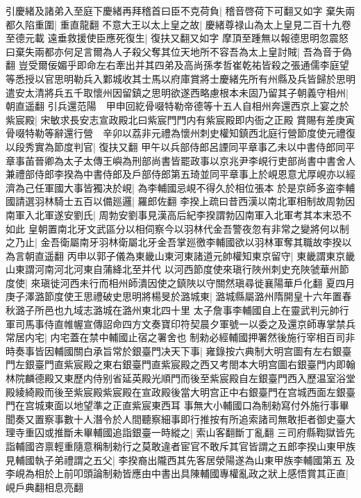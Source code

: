 引慶緒及諸弟入至庭下慶緒再拜稽首曰臣不克荷負|{
	稽音啓荷下可翻又如字}
棄失兩都久陷重圍|{
	重直龍翻}
不意大王以太上皇之故|{
	慶緒尊禄山為太上皇見二百十九卷至德元載}
遠垂救援使臣應死復生|{
	復扶又翻又如字}
摩頂至踵無以報德思明忽震怒曰棄失兩都亦何足言爾為人子殺父奪其位天地所不容吾為太上皇討賊|{
	吾為音于偽翻}
豈受爾佞媚乎即命左右牽出并其四弟及高尚孫孝哲崔乾祐皆殺之張通儒李庭望等悉授以官思明勒兵入鄴城收其士馬以府庫賞將士慶緒先所有州縣及兵皆歸於思明遣安太清將兵五千取懷州因留鎮之思明欲遂西略慮根本未固乃留其子朝義守相州|{
	朝直遥翻}
引兵還范陽　甲申回紇骨啜特勒帝德等十五人自相州奔還西京上宴之於紫宸殿|{
	宋敏求長安志宣政殿北曰紫宸門門内有紫宸殿即内衙之正殿}
賞賜有差庚寅骨啜特勒等辭還行營　辛卯以荔非元禮為懷州刺史權知鎮西北庭行營節度使元禮復以段秀實為節度判官|{
	復扶又翻}
甲午以兵部侍郎呂諲同平章事乙未以中書侍郎同平章事苖晉卿為太子太傳王嶼為刑部尚書皆罷政事以京兆尹李峴行吏部尚書中書舍人兼禮部侍郎李揆為中書侍郎及戶部侍郎第五琦並同平章事上於峴恩意尤厚峴亦以經濟為己任軍國大事皆獨决於峴|{
	為李輔國忌峴不得久於相位張本}
於是京師多盗李輔國請選羽林騎士五百以備廵邏|{
	羅郎佐翻}
李揆上疏曰昔西漢以南北軍相制故周勃因南軍入北軍遂安劉氏|{
	周勃安劉事見漢高后紀李揆謂勃囚南軍入北軍考其本末恐不如此}
皇朝置南北牙文武區分以相伺察今以羽林代金吾警夜忽有非常之變將何以制之乃止|{
	金吾衛屬南牙羽林衛屬北牙金吾掌廵徼李輔國欲以羽林軍奪其職故李揆以為言朝直遥翻}
丙申以郭子儀為東畿山東河東諸道元帥權知東京留守|{
	東畿謂東京畿山東謂河南河北河東自蒲絳北至并代}
以河西節度使來瑱行陜州刺史充陜虢華州節度使|{
	來瑱徙河西未行而相州師潰因使之鎮陜以守關然瑱尋徙襄陽華戶化翻}
夏四月庚子澤潞節度使王思禮破史思明將楊旻於潞城東|{
	潞城縣屬潞州隋開皇十六年置春秋潞子所邑也九域志潞城在潞州東北四十里}
太子詹事李輔國自上在靈武判元帥行軍司馬事侍直帷幄宣傳詔命四方文奏寶印符契晨夕軍號一以委之及還京師專掌禁兵常居内宅|{
	内宅蓋在禁中輔國止宿之署舍也}
制勑必經輔國押署然後施行宰相百司非時奏事皆因輔國關白承旨常於銀臺門决天下事|{
	雍錄按六典制大明宫圖有左右銀臺門左銀臺門直紫宸殿之東右銀臺門直紫宸殿之西又考閤本大明宫圖右銀臺門内即翰林院麟德殿又東歷内侍别省延英殿光順門而後至紫宸殿自左銀臺門西入歷温室浴堂殿綾綺殿而後至紫宸殿紫宸殿在宣政殿後當大明宫正中右銀臺門在宫城西面左銀臺門在宫城東面以地望準之正直紫宸東西耳}
事無大小輔國口為制勑寫付外施行事畢聞奏又置察事數十人潛令於人間聽察細事即行推按有所追索諸司無敢拒者御史臺大理寺重囚或推斷未畢輔國追詣銀臺一時縱之|{
	索山客翻斷丁亂翻}
三司府縣鞫獄皆先詣輔國咨禀輕重隨意稱制勑行之莫敢違者宦官不敢斥其官皆謂之五郎李揆山東甲族見輔國執子弟禮謂之五父|{
	李揆裔出隴西其先客居滎陽遂為山東甲族李輔國第五}
及李峴為相於上前叩頭論制勑皆應由中書出具陳輔國專權亂政之狀上感悟賞其正直|{
	峴戶典翻相息亮翻}
